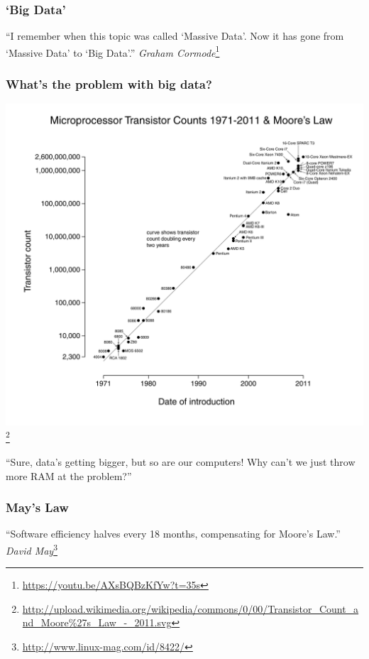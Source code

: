 \documentclass{beamer}
\begin{document}
\begin{frame}
\frametitle{`Big Data'}
``I remember when this topic was called `Massive Data'. Now it has gone from `Massive Data' to `Big Data'.''
\textit{Graham Cormode}\footnote{\url{https://youtu.be/AXsBQBzKfYw?t=35s}}
\end{frame}


\begin{frame}
\frametitle{What's the problem with big data?}
\begin{center}
\includegraphics[width=0.4\paperwidth]{moores_law}\footnote{\url{http://upload.wikimedia.org/wikipedia/commons/0/00/Transistor_Count_and_Moore\%27s_Law_-_2011.svg}}
\end{center}
``Sure, data's getting bigger, but so are our computers! Why can't we just throw more RAM at the problem?''
\end{frame}


\begin{frame}
\frametitle{May's Law}
``Software efficiency halves every 18 months, compensating for Moore's Law.''
\textit{David May}\footnote{\url{http://www.linux-mag.com/id/8422/}}
\end{frame}

\end{document}
